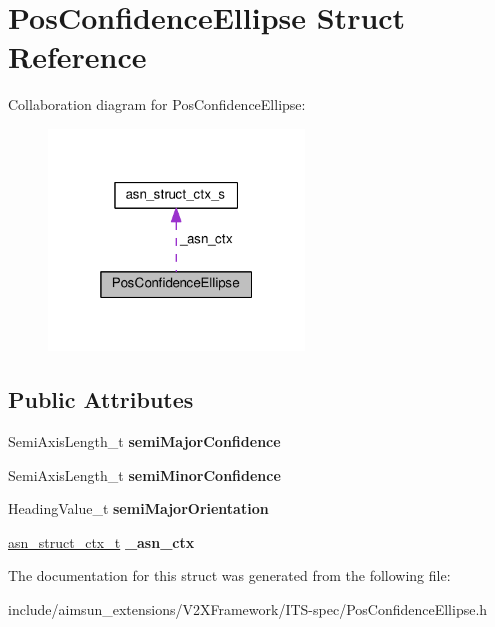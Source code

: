 \hypertarget{structPosConfidenceEllipse}{}\section{Pos\+Confidence\+Ellipse Struct Reference}
\label{structPosConfidenceEllipse}


Collaboration diagram for Pos\+Confidence\+Ellipse\+:\nopagebreak
\begin{figure}[H]
\begin{center}
\leavevmode
\includegraphics[width=193pt]{structPosConfidenceEllipse__coll__graph}
\end{center}
\end{figure}
\subsection*{Public Attributes}
\begin{DoxyCompactItemize}
\item 
Semi\+Axis\+Length\+\_\+t {\bfseries semi\+Major\+Confidence}\hypertarget{structPosConfidenceEllipse_a786124f5df8480dc7149219af1addbc2}{}\label{structPosConfidenceEllipse_a786124f5df8480dc7149219af1addbc2}

\item 
Semi\+Axis\+Length\+\_\+t {\bfseries semi\+Minor\+Confidence}\hypertarget{structPosConfidenceEllipse_a1aa4b649529545e8f9747267e43e80d1}{}\label{structPosConfidenceEllipse_a1aa4b649529545e8f9747267e43e80d1}

\item 
Heading\+Value\+\_\+t {\bfseries semi\+Major\+Orientation}\hypertarget{structPosConfidenceEllipse_ad679fd13bc3b631752798bce75cca7a3}{}\label{structPosConfidenceEllipse_ad679fd13bc3b631752798bce75cca7a3}

\item 
\hyperlink{structasn__struct__ctx__s}{asn\+\_\+struct\+\_\+ctx\+\_\+t} {\bfseries \+\_\+asn\+\_\+ctx}\hypertarget{structPosConfidenceEllipse_a5764a12b7829dc987829afc87d636b31}{}\label{structPosConfidenceEllipse_a5764a12b7829dc987829afc87d636b31}

\end{DoxyCompactItemize}


The documentation for this struct was generated from the following file\+:\begin{DoxyCompactItemize}
\item 
include/aimsun\+\_\+extensions/\+V2\+X\+Framework/\+I\+T\+S-\/spec/Pos\+Confidence\+Ellipse.\+h\end{DoxyCompactItemize}
